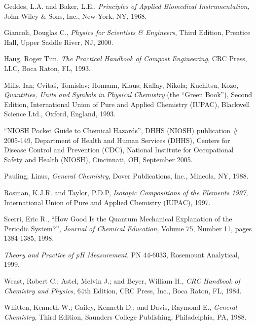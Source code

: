 \noindent
Geddes, L.A. and Baker, L.E., \textit{Principles of Applied Biomedical Instrumentation}, John Wiley \& Sons, Inc., New York, NY, 1968.

\vskip 10pt

\noindent
Giancoli, Douglas C., \textit{Physics for Scientists \& Engineers}, Third Edition, Prentice Hall, Upper Saddle River, NJ, 2000.

\vskip 10pt

\noindent
Haug, Roger Tim, \textit{The Practical Handbook of Compost Engineering}, CRC Press, LLC, Boca Raton, FL, 1993.

\vskip 10pt

\noindent
Mills, Ian; Cvita\u s, Tomislav; Homann, Klaus; Kallay, Nikola; Kuchitsu, Kozo, \textit{Quantities, Units and Symbols in Physical Chemistry} (the ``Green Book''), Second Edition, International Union of Pure and Applied Chemistry (IUPAC), Blackwell Science Ltd., Oxford, England, 1993.

\vskip 10pt

\noindent
``NIOSH Pocket Guide to Chemical Hazards'', DHHS (NIOSH) publication \# 2005-149, Department of Health and Human Services (DHHS), Centers for Disease Control and Prevention (CDC), National Institute for Occupational Safety and Health (NIOSH), Cincinnati, OH, September 2005.

\vskip 10pt

\noindent
Pauling, Linus, \textit{General Chemistry}, Dover Publications, Inc., Mineola, NY, 1988.

\vskip 10pt

\noindent
Rosman, K.J.R. and Taylor, P.D.P, \textit{Isotopic Compositions of the Elements 1997}, International Union of Pure and Applied Chemistry (IUPAC), 1997.

\vskip 10pt

\noindent
Scerri, Eric R., ``How Good Is the Quantum Mechanical Explanation of the Periodic System?'', \textit{Journal of Chemical Education}, Volume 75, Number 11, pages 1384-1385, 1998.

\vskip 10pt

\noindent
\textit{Theory and Practice of pH Measurement}, PN 44-6033, Rosemount Analytical, 1999.

\vskip 10pt

\noindent
Weast, Robert C.; Astel, Melvin J.; and Beyer, William H., \textit{CRC Handbook of Chemistry and Physics}, 64th Edition, CRC Press, Inc., Boca Raton, FL, 1984.

\vskip 10pt

\noindent
Whitten, Kenneth W.; Gailey, Kenneth D.; and Davis, Raymond E., \textit{General Chemistry}, Third Edition, Saunders College Publishing, Philadelphia, PA, 1988.














%
